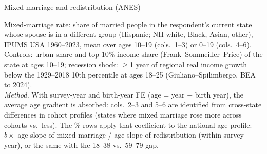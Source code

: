 \documentclass[aspectratio=169]{beamer}
\begin{document}
\begin{frame}{Mixed marriage and redistribution (ANES)}

\begin{table}
    \centering
    \scalebox{0.72}{\parbox{\linewidth}{\centering\tiny\setlength{\tabcolsep}{4pt}\renewcommand{\arraystretch}{0.72}
    }}
\end{table}
\vspace{0.1em}
{\tiny Mixed-marriage rate: share of married people in the respondent's current state whose spouse is in a different group (Hispanic; NH white, Black, Asian, other), IPUMS USA 1960--2023, mean over ages 10--19 (cols.\ 1--3) or 0--19 (cols.\ 4--6). Controls: urban share and top-10\% income share (Frank--Sommeiller--Price) of the state at ages 10--19; recession shock: $\geq$1 year of regional real income growth below the 1929--2018 10th percentile at ages 18--25 (Giuliano--Spilimbergo, BEA to 2024).\\[1pt]\textit{Method.} With survey-year and birth-year FE (age = year $-$ birth year), the average age gradient is absorbed: cols.\ 2--3 and 5--6 are identified from cross-state differences in cohort profiles (states where mixed marriage rose more across cohorts vs.\ less). The \% rows apply that coefficient to the national age profile: $b\times$ age slope of mixed marriage / age slope of redistribution (within survey year), or the same with the 18--38 vs.\ 59--79 gap.\par}

\end{frame}



%
%
\end{document}
